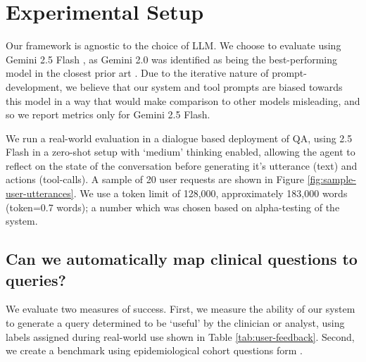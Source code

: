 \documentclass[11pt]{article}
\begin{document}


\section{Experimental Setup}
Our framework is agnostic to the choice of LLM. We choose to evaluate using Gemini 2.5 Flash \citet{comanici_gemini_2025}, as Gemini 2.0 was identified as being the best-performing model in the closest prior art \citet{ziletti_generating_2025}.
Due to the iterative nature of prompt-development, we believe that our system and tool prompts are biased towards this model in a way that would make comparison to other models misleading, and so we report metrics only for Gemini 2.5 Flash.

We run a real-world evaluation in a dialogue based deployment of QA, using 2.5 Flash in a zero-shot setup with `medium' thinking enabled, allowing the agent to reflect on the state of the conversation before generating it's utterance (text) and actions (tool-calls). A sample of 20 user requests are shown in Figure \ref{fig:sample-user-utterances}. We use a token limit of 128,000, approximately 183,000 words (token=0.7 words); a number which was chosen based on alpha-testing of the system.

\subsection*{Can we automatically map clinical questions to queries?}

We evaluate two measures of success.
First, we measure the ability of our system to generate a query determined to be `useful' by the clinician or analyst, using labels assigned during real-world use shown in Table \ref{tab:user-feedback}.
Second, we create a benchmark using epidemiological cohort questions form \citet{ziletti_generating_2025}.

\end{document}
